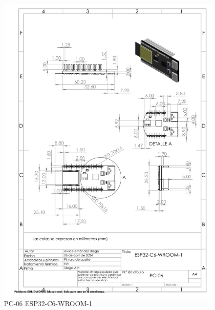     \begin{figure}[H]
        \centering
        \includegraphics[scale=0.4]{3/Img/esp32Dibujo.pdf}
        \caption{PC-06 ESP32-C6-WROOM-1} 
        \label{fig:esp32Dibujo}
    \end{figure}
